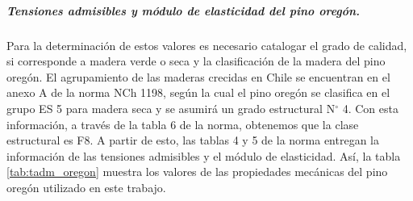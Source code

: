 \begin{table}[h]
\centering
{}
\caption{Valores de la densidad normal y anhidra del pino oregón. $^{\dagger}$: Definido con el percentil 5\% de exclusión. \cite{nch1198}}
\label{tab:densidad_oregon}
\end{table}

\subparagraph{Tensiones admisibles y módulo de elasticidad del pino oregón.}
Para la determinación de estos valores es necesario catalogar el grado de calidad, si corresponde a madera verde o seca y la clasificación de la madera del pino oregón. El agrupamiento de las maderas crecidas en Chile se encuentran en el anexo A de la norma NCh 1198, según la cual el pino oregón se clasifica en el grupo ES 5 para madera seca y se asumirá un grado estructural N$^{\circ}$ 4. Con esta información, a través de la tabla 6 de la norma, obtenemos que la clase estructural es F8. A partir de esto, las tablas 4 y 5 de la norma entregan la información de las tensiones admisibles y el módulo de elasticidad. Así, la tabla \ref{tab:tadm_oregon} muestra los valores de las propiedades mecánicas del pino oregón utilizado en este trabajo.

